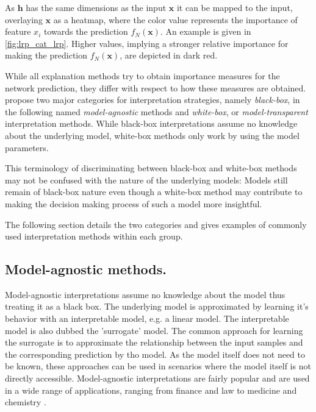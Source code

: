 \setlength{\leftskip}{0pt}
\par\smallskip\vspace{-0.1cm}

As $\mathbf{h}$ has the same dimensions as the input $\mathbf{x}$ it can be mapped to the input, overlaying $\mathbf{x}$ as a heatmap, where the color value represents the importance of feature $x_i$ towards the prediction $f_N(\mathbf{x})$.
An example is given in \autoref{fig:lrp_cat_lrp}. Higher values, implying a stronger relative importance for making the prediction $f_N(\mathbf{x})$, are depicted in dark red. 

While all explanation methods try to obtain importance measures for the network prediction, they differ with respect to how these measures are obtained. \cite{evaluating_explanations_security} propose two major categories for interpretation strategies, namely \textit{black-box}, in the following named \textit{model-agnostic} methods and \textit{white-box}, or \textit{model-transparent} interpretation methods. 
While black-box interpretations assume no knowledge about the underlying model, white-box methods only work by using the model parameters. 

This terminology of discriminating between black-box and white-box methods may not be confused with the nature of the underlying models: Models still remain of black-box nature even though a white-box method may contribute to making the decision making process of such a model more insightful.

The following section details the two categories and gives examples of commonly used interpretation methods within each group. 

\subsection{Model-agnostic methods.}
\label{subsec:bb_methods}

Model-agnostic interpretations assume no knowledge about the model thus treating it as a black box. The underlying model is approximated by learning it's behavior with an interpretable model, e.g. a linear model. The interpretable model is also dubbed the 'surrogate' model. The common approach for learning the surrogate is to approximate the relationship between the input samples and the corresponding prediction by tho model.
As the model itself does not need to be known, these approaches can be used in scenarios where the model itself is not directly accessible. Model-agnostic interpretations are fairly popular and are used in a wide range of applications, ranging from finance and law to medicine and chemistry \cite{elshawi2019interpretability, whitmore2016mapping}. 

